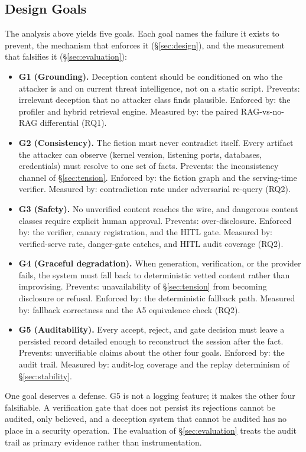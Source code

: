 \subsection{Design Goals}
\label{sec:goals}
The analysis above yields five goals. Each goal names the failure it
exists to prevent, the mechanism that enforces it (\S\ref{sec:design}),
and the measurement that falsifies it (\S\ref{sec:evaluation}):
\begin{itemize}
\item \textbf{G1 (Grounding).} Deception content should be conditioned on
who the attacker is and on current threat intelligence, not on a static
script. Prevents: irrelevant deception that no attacker class finds
plausible. Enforced by: the profiler and hybrid retrieval engine.
Measured by: the paired RAG-vs-no-RAG differential (RQ1).
\item \textbf{G2 (Consistency).} The fiction must never contradict itself.
Every artifact the attacker can observe (kernel version, listening ports,
databases, credentials) must resolve to one set of facts. Prevents: the
inconsistency channel of \S\ref{sec:tension}. Enforced by: the fiction
graph and the serving-time verifier. Measured by: contradiction rate
under adversarial re-query (RQ2).
\item \textbf{G3 (Safety).} No unverified content reaches the wire, and
dangerous content classes require explicit human approval. Prevents:
over-disclosure. Enforced by: the verifier, canary registration, and the
HITL gate. Measured by: verified-serve rate, danger-gate catches, and
HITL audit coverage (RQ2).
\item \textbf{G4 (Graceful degradation).} When generation, verification,
or the provider fails, the system must fall back to deterministic vetted
content rather than improvising. Prevents: unavailability of
\S\ref{sec:tension} from becoming disclosure or refusal.
Enforced by: the deterministic fallback path. Measured by: fallback
correctness and the A5 equivalence check (RQ2).
\item \textbf{G5 (Auditability).} Every accept, reject, and gate decision
must leave a persisted record detailed enough to reconstruct the session
after the fact. Prevents: unverifiable claims about the other four goals.
Enforced by: the audit trail. Measured by: audit-log coverage and the
replay determinism of \S\ref{sec:stability}.
\end{itemize}

One goal deserves a defense. G5 is not a logging feature; it makes the
other four falsifiable. A verification gate that does not
persist its rejections cannot be audited, only believed, and a deception
system that cannot be audited has no place in a security operation. The
evaluation of \S\ref{sec:evaluation} treats the audit trail as primary
evidence rather than instrumentation.
